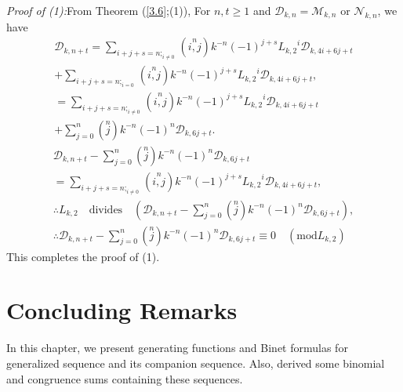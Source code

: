 \textit{Proof of (1):}From Theorem (\ref{3.6};(1)), For $n, t\geq 1$ and $\mathcal{D}_{k,n}=\mathcal{M}_{k,n}$ or $\mathcal{N}_{k,n}$, we have\\
\begin{align*}
\mathcal{D}_{k,n+t}=\sum\limits_{{i+j+s=n};_{i\neq 0}}\left( \stackrel{n}{i,j}\right) k^{-n}(-1)^{j+s}{L_{k,2}}^i\mathcal{D}_{k,4i+6j+t}\\+\sum\limits_{{i+j+s=n};_{i= 0}}\left( \stackrel{n}{i,j}\right) k^{-n}(-1)^{j+s}{L_{k,2}}^i\mathcal{D}_{k,4i+6j+t},\\
=\sum\limits_{{i+j+s=n};_{i\neq 0}}\left( \stackrel{n}{i,j}\right) k^{-n}(-1)^{j+s}{L_{k,2}}^i\mathcal{D}_{k,4i+6j+t}\\+\sum\limits_{j=0}^{n}\left( \stackrel{n}{j}\right) k^{-n}(-1)^{n}\mathcal{D}_{k,6j+t}.
\end{align*}
\begin{align*}
\mathcal{D}_{k,n+t}-\sum\limits_{j=0}^{n}\left( \stackrel{n}{j}\right) k^{-n}(-1)^{n}\mathcal{D}_{k,6j+t}\\=\sum\limits_{{i+j+s=n};_{i\neq 0}}\left( \stackrel{n}{i,j}\right) k^{-n}(-1)^{j+s}{L_{k,2}}^i\mathcal{D}_{k,4i+6j+t},\\
\therefore L_{k,2} \quad\text{divides}\quad(\mathcal{D}_{k,n+t}-\sum\limits_{j=0}^{n}\left( \stackrel{n}{j}\right) k^{-n}(-1)^{n}\mathcal{D}_{k,6j+t}),\\
\therefore\mathcal{D}_{k,n+t}-\sum\limits_{j=0}^{n}\left( \stackrel{n}{j}\right) k^{-n}(-1)^{n}\mathcal{D}_{k,6j+t}\equiv 0\quad (\text{mod} L_{k,2})
\end{align*}
This completes the proof of (1).
\section{Concluding Remarks}
In this chapter, we present generating functions and Binet formulas for generalized \kL\vspace{.5mm} sequence and its companion sequence. Also, derived some binomial and congruence sums containing these sequences.

